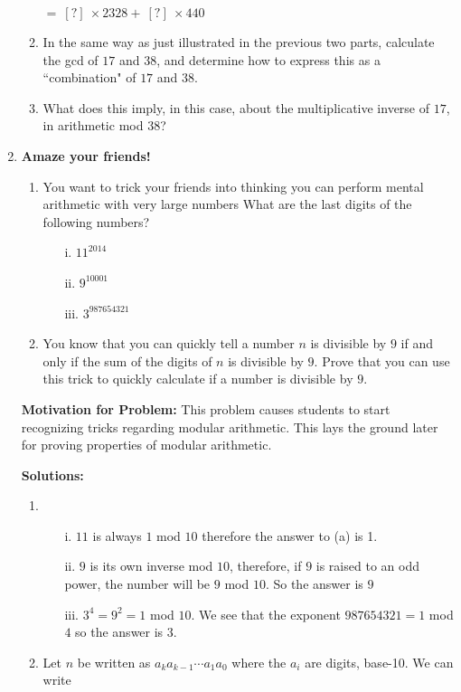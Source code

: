 \documentclass[11pt]{article}
\newif\ifsolutions
\begin{document}
\begin{enumerate}
\begin{enumerate}
$= \ [?] \  \times 2328 + \ [?] \ \times 440$ \ifsolutions{$31 \times 2328 - 164 \times 440$} \fi
\item In the same way as just illustrated in the previous two parts, calculate the gcd of $17$ and $38$, and determine how to express this as a ``combination" of $17$ and $38$. \ifsolutions{$\gcd(17, 38) = 1 = 13 \times 38 - 29 \times 17; also, more simply, -4 \times 38 + 9 \times 17, but the algorithm produces the former$} \fi

\item What does this imply, in this case, about the multiplicative inverse of $17$, in arithmetic mod $38$? \ifsolutions{It is equal to -29, which is equal to 9}

{\bf Motivation for problem:} This is supposed to provide the students with some understanding of how the extended-gcd works. \fi
\end{enumerate}

\vspace{25mm}

\item {\bf Amaze your friends!} 
\begin{enumerate}
\item You want to trick your friends into thinking you can perform mental arithmetic with very large numbers
What are the last digits of the following numbers?
\begin{enumerate}
\item[i.] \quad $11^{2014}$
\item[ii.] \quad $9^{10001}$
\item[iii.] \quad $3^{987654321}$
\end{enumerate}
\item You know that you can quickly tell a number $n$ is divisible by $9$ if and only if the sum of the digits of $n$ is divisible by $9$. Prove that you can use this trick to quickly calculate if a number is divisible by $9$.
\end{enumerate}

\ifsolutions
\textbf{Motivation for Problem:} This problem causes students to start recognizing tricks regarding modular arithmetic. This lays the ground later for proving properties of modular arithmetic.

\textbf{Solutions:}
\begin{enumerate}
\item
\begin{enumerate}
\item[i.] \quad $11$ is always $1$ mod $10$ therefore the answer to (a) is 1.
\item[ii.] \quad $9$ is its own inverse mod $10$, therefore, if $9$ is raised to an odd power, the number will be $9$ mod $10$. So the answer is $9$
\item[iii.] \quad $3^4 = 9^2 = 1 $ mod $ 10$. We see that the exponent $987654321 = 1$ mod $4$ so the answer is $3$.
\end{enumerate}
\item  Let $n$ be written as $a_k a_{k-1}\cdots a_1 a_0$ where the $a_i$ are digits, base-10.
       We can write 


\end{enumerate}
\end{enumerate}
\end{document}
